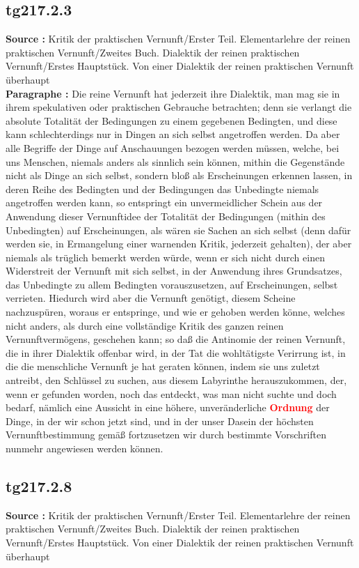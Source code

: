 \documentclass[a4paper,12pt,twoside]{book}
\newcommand{\match}[1]{\textcolor{red}{\textbf{#1}}}
\begin{document}
	\subsection*{tg217.2.3} 
	\textbf{Source : }Kritik der praktischen Vernunft/Erster Teil. Elementarlehre der reinen praktischen Vernunft/Zweites Buch. Dialektik der reinen praktischen Vernunft/Erstes Hauptstück. Von einer Dialektik der reinen praktischen Vernunft überhaupt\\  
	
	\noindent\textbf{Paragraphe : }Die reine Vernunft hat jederzeit ihre Dialektik, man mag sie in ihrem spekulativen oder praktischen Gebrauche betrachten; denn sie verlangt die absolute Totalität der Bedingungen zu einem gegebenen Bedingten, und diese kann schlechterdings nur in Dingen an sich selbst angetroffen werden. Da aber alle Begriffe der Dinge auf Anschauungen bezogen werden müssen, welche, bei uns Menschen, niemals anders als sinnlich sein können, mithin die Gegenstände nicht als Dinge an sich selbst, sondern bloß als Erscheinungen erkennen lassen, in deren Reihe des Bedingten und der Bedingungen das Unbedingte niemals angetroffen werden kann, so entspringt ein unvermeidlicher Schein aus der Anwendung dieser Vernunftidee der Totalität der Bedingungen  (mithin des Unbedingten) auf Erscheinungen, als wären sie Sachen an sich selbst (denn dafür werden sie, in Ermangelung einer warnenden Kritik, jederzeit gehalten), der aber niemals als trüglich bemerkt werden würde, wenn er sich nicht durch einen Widerstreit der Vernunft mit sich selbst, in der Anwendung ihres Grundsatzes, das Unbedingte zu allem Bedingten vorauszusetzen, auf Erscheinungen, selbst verrieten. Hiedurch wird aber die Vernunft genötigt, diesem Scheine nachzuspüren, woraus er entspringe, und wie er gehoben werden könne, welches nicht anders, als durch eine vollständige Kritik des ganzen reinen Vernunftvermögens, geschehen kann; so daß die Antinomie der reinen Vernunft, die in ihrer Dialektik offenbar wird, in der Tat die wohltätigste Verirrung ist, in die die menschliche Vernunft je hat geraten können, indem sie uns zuletzt antreibt, den Schlüssel zu suchen, aus diesem Labyrinthe herauszukommen, der, wenn er gefunden worden, noch das entdeckt, was man nicht suchte und doch bedarf, nämlich eine Aussicht in eine höhere, unveränderliche \match{Ordnung} der Dinge, in der wir schon jetzt sind, und in der unser Dasein der höchsten Vernunftbestimmung gemäß fortzusetzen wir durch bestimmte Vorschriften nunmehr angewiesen werden können. 
	
	\subsection*{tg217.2.8} 
	\textbf{Source : }Kritik der praktischen Vernunft/Erster Teil. Elementarlehre der reinen praktischen Vernunft/Zweites Buch. Dialektik der reinen praktischen Vernunft/Erstes Hauptstück. Von einer Dialektik der reinen praktischen Vernunft überhaupt\\  
	
\end{document}
